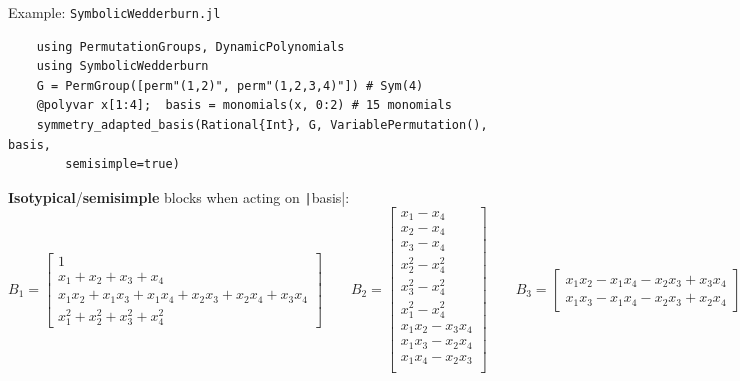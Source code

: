 \documentclass[9pt]{beamer}
\theoremstyle{definition}
\newcommand{\comment}[1]{{\footnotesize \color{black!50}{#1}}}
\begin{document}
  \begin{frame}[fragile]{Example: {\texttt{SymbolicWedderburn.jl}}}
  \small
  \begin{verbatim}
    using PermutationGroups, DynamicPolynomials
    using SymbolicWedderburn
    G = PermGroup([perm"(1,2)", perm"(1,2,3,4)"]) # Sym(4)
    @polyvar x[1:4];  basis = monomials(x, 0:2) # 15 monomials
    symmetry_adapted_basis(Rational{Int}, G, VariablePermutation(), basis,
        semisimple=true)
  \end{verbatim}
  \normalsize
  \textbf{Isotypical}/\textbf{semisimple} blocks when acting on \texttt|basis|:
  {\scriptsize
  \[
    B_1 = \begin{bmatrix}
            1\\
            x_1 + x_2 + x_3 + x_4\\
            x_{1}x_{2} + x_{1}x_{3} + x_{1}x_{4} + x_{2}x_{3} + x_{2}x_{4} + x_{3}x_{4}\\
            x_{1}^{2} + x_{2}^{2} + x_{3}^{2} + x_{4}^{2}
          \end{bmatrix}
    \qquad
    B_2 = \begin{bmatrix}
          x_{1} - x_{4}\\
          x_{2} - x_{4}\\
          x_{3} - x_{4}\\
          x_{2}^{2} - x_{4}^{2}\\
          x_{3}^{2} - x_{4}^{2}\\
          x_{1}^{2} - x_{4}^{2}\\
          x_{1}x_{2} - x_{3}x_{4}\\
          x_{1}x_{3} - x_{2}x_{4}\\
          x_{1}x_{4} - x_{2}x_{3}\\
          \end{bmatrix}
    \qquad
    B_3 = \begin{bmatrix}
          x_{1}x_{2} - x_{1}x_{4} - x_{2}x_{3} + x_{3}x_{4}\\
          x_{1}x_{3} - x_{1}x_{4} - x_{2}x_{3} + x_{2}x_{4}
          \end{bmatrix}
  \]
  }

  \comment{We went from $15\times 15$-psd constrain to sizes $(4\times 4, 9\times 9, 2\times 2)$.}
  \end{frame}
\end{document}

